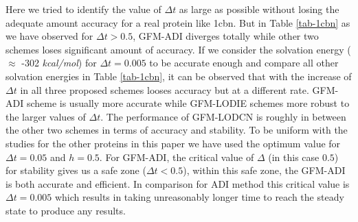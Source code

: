 Here we tried to identify the value of $\Delta t$ as large as possible without losing the adequate amount accuracy for a real protein like 1cbn. But in Table \ref{tab-1cbn} as we have observed  for $\Delta t > 0.5$, GFM-ADI diverges totally while other two schemes loses significant amount of accuracy. If we consider the solvation energy ($\approx $ -302 {\it kcal/mol}) for $\Delta t =0.005$ to be accurate enough and compare all other solvation energies in Table \ref{tab-1cbn}, it can be observed that with the increase of $\Delta t$ in all three proposed schemes looses accuracy but at a different rate. GFM-ADI scheme is usually more accurate while GFM-LODIE schemes more robust to the larger values of $\Delta t$. The performance of GFM-LODCN is roughly in between the other two schemes in terms of accuracy and stability. To be uniform  with the studies for the other proteins in this paper we have used the optimum value for $\Delta t =0.05$ and $h=0.5$. For GFM-ADI, the critical value of $\Delta$ (in this case $0.5$) for stability gives us a safe zone ($\Delta t < 0.5$), within this safe zone, the GFM-ADI is both accurate and efficient. In comparison for ADI method this critical value is $\Delta t = 0.005$ which results in taking unreasonably longer time to reach the steady state to produce any results. 

